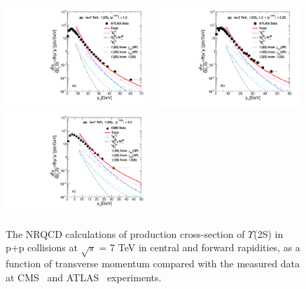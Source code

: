 \documentclass[review]{elsarticle}
\begin{document}

\begin{figure}
  \centering
  \includegraphics[width=0.49\textwidth]{Figures/NRQCD_Beauty/Fig5a_ATLAS_D2NDPtDy_Y2S_Y1212_Pt.pdf}
  \includegraphics[width=0.49\textwidth]{Figures/NRQCD_Beauty/Fig5b_ATLAS_D2NDPtDy_Y2S_Y12225_Pt.pdf}
  \includegraphics[width=0.49\textwidth]{Figures/NRQCD_Beauty/Fig5c_CMS_D2NDPtDy_Y2S_Y0024_Pt.pdf}
  \caption{\small{The NRQCD calculations of production cross-section of $\Upsilon$(2S) in p+p collisions at 
      $\sqrt{s}$ = 7 TeV in central and forward rapidities, as a function of transverse momentum compared with the measured data 
      at CMS~\cite{Chatrchyan:2013yna} and ATLAS~\cite{Aad:2012dlq} experiments. }}
  \label{Fig:SigmaY2SATLAS}
\end{figure}
\end{document}
